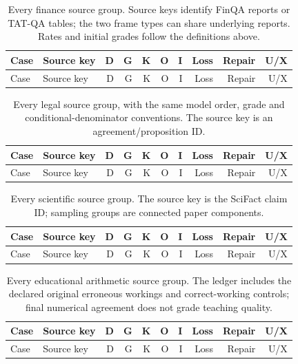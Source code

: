 \begingroup\small\setlength{\tabcolsep}{3pt}
\begin{longtable}{lp{.26\linewidth}rrrrrrrr}
\caption{Every finance source group. Source keys identify FinQA reports or
TAT-QA tables; the two frame types can share underlying reports. Rates and
initial grades follow the definitions above.}
\label{tab:diagnostic-ledger-finance}\\
\toprule Case & Source key & D & G & K & O & I & Loss & Repair & U/X\\\midrule\endfirsthead
\toprule Case & Source key & D & G & K & O & I & Loss & Repair & U/X\\\midrule\endhead

\bottomrule\end{longtable}\endgroup
\begingroup\small\setlength{\tabcolsep}{3pt}
\begin{longtable}{lp{.26\linewidth}rrrrrrrr}
\caption{Every legal source group, with the same model order, grade and
conditional-denominator conventions. The source key is an agreement/proposition ID.}
\label{tab:diagnostic-ledger-legal}\\
\toprule Case & Source key & D & G & K & O & I & Loss & Repair & U/X\\\midrule\endfirsthead
\toprule Case & Source key & D & G & K & O & I & Loss & Repair & U/X\\\midrule\endhead

\bottomrule\end{longtable}\endgroup
\begingroup\small\setlength{\tabcolsep}{3pt}
\begin{longtable}{lp{.26\linewidth}rrrrrrrr}
\caption{Every scientific source group. The source key is the SciFact claim
ID; sampling groups are connected paper components.}
\label{tab:diagnostic-ledger-science}\\
\toprule Case & Source key & D & G & K & O & I & Loss & Repair & U/X\\\midrule\endfirsthead
\toprule Case & Source key & D & G & K & O & I & Loss & Repair & U/X\\\midrule\endhead

\bottomrule\end{longtable}\endgroup
\begingroup\small\setlength{\tabcolsep}{3pt}
\begin{longtable}{lp{.26\linewidth}rrrrrrrr}
\caption{Every educational arithmetic source group. The ledger includes the
declared original erroneous workings and correct-working controls; final
numerical agreement does not grade teaching quality.}
\label{tab:diagnostic-ledger-education}\\
\toprule Case & Source key & D & G & K & O & I & Loss & Repair & U/X\\\midrule\endfirsthead
\toprule Case & Source key & D & G & K & O & I & Loss & Repair & U/X\\\midrule\endhead

\bottomrule\end{longtable}\endgroup


